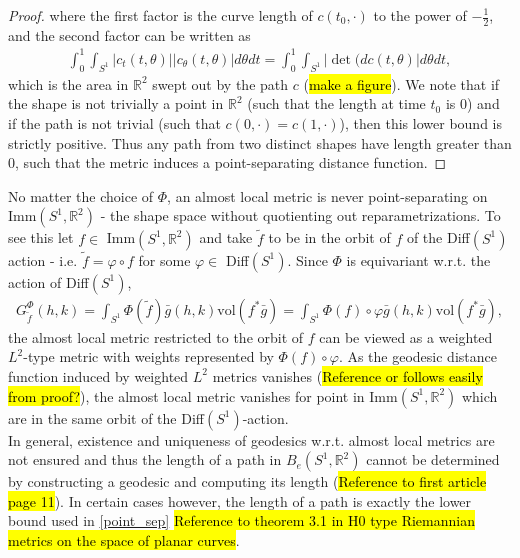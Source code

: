 \documentclass[a4,danish]{article}
\theoremstyle{break}
\theoremstyle{definition}
\theoremstyle{Break}
\newcommand{\R}{\mathbb{R}}
\renewcommand{\phi}{\varphi}
\begin{document}
\begin{proof}
where the first factor is the curve length of $c(t_0, \cdot)$ to the power of $-\frac{1}{2}$, and the second factor can be written as
\begin{align*}
\int_0^1 \int_{S^1} \left| c_t(t, \theta) \right| \left| c_\theta(t, \theta) \right| d \theta dt = \int_0^1 \int_{S^1} \left| \det (d c(t, \theta) \right| d \theta dt,
\end{align*}
which is the area in $\R^2$ swept out by the path $c$ (\hl{make a figure}). We note that if the shape is not trivially a point in $\R^2$ (such that the length at time $t_0$ is $0$) and if the path is not trivial (such that $c(0, \cdot) = c(1, \cdot)$), then this lower bound is strictly positive. Thus any path from two distinct shapes have length greater than $0$, such that the metric induces a point-separating distance function. 
\end{proof}


No matter the choice of $\Phi$, an almost local metric is never point-separating on Imm$(S^1, \R^2)$ - the shape space without quotienting out reparametrizations. To see this let $f \in$ Imm$(S^1, \R^2)$ and take $\tilde{f}$ to be in the orbit of $f$ of the Diff$(S^1)$ action - i.e. $\tilde{f} = \phi \circ f$ for some $\phi \in$ Diff$(S^1)$. Since $\Phi$ is equivariant w.r.t. the action of Diff$(S^1)$, 
\begin{align*}
G_{\tilde{f}}^\Phi (h,k) = \int_{S^1} \Phi(\tilde{f}) \bar{g}(h,k) \text{vol}(f^* \bar{g}) = \int_{S^1} \Phi(f) \circ \phi \bar{g}(h,k) \text{vol}(f^* \bar{g}),
\end{align*}
the almost local metric restricted to the orbit of $f$ can be viewed as a weighted $L^2$-type metric with weights represented by $\Phi(f) \circ \phi$. As the geodesic distance function induced by weighted $L^2$ metrics vanishes (\hl{Reference or follows easily from proof?}), the almost local metric vanishes for point in Imm$(S^1, \R^2)$ which are in the same orbit of the Diff$(S^1)$-action.
\\[0.2 cm]
In general, existence and uniqueness of geodesics w.r.t. almost local metrics are not ensured and thus the length of a path in $B_e(S^1,\R^2)$ cannot be determined by constructing a geodesic and computing its length (\hl{Reference to first article page 11}). In certain cases however, the length of a path is exactly the lower bound used in \ref{point_sep} \hl{Reference to theorem 3.1 in H0 type Riemannian metrics on the space of planar curves}.
\end{document}
